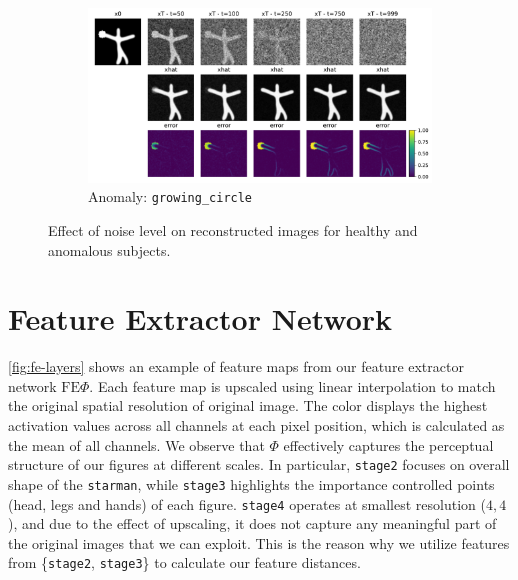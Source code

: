 \begin{figure}[htbp]
    \begin{subfigure}{0.75\linewidth}
        \includegraphics[width=\linewidth]{figures/effect_noise_growing_circle.pdf}
        \caption{Anomaly: \texttt{growing\_circle}}
    \end{subfigure}

    \caption{Effect of noise level on reconstructed images for healthy and anomalous subjects.}
    \label{fig:effect-noise-example}
\end{figure}

\chapter{Feature Extractor Network}
\label{app:fe-layer}

\cref{fig:fe-layers} shows an example of feature maps from our feature extractor network $\text{FE} \Phi$. Each feature map is upscaled using linear interpolation to match the original spatial resolution of original image. The color displays the highest activation values across all channels at each pixel position, which is calculated as the mean of all channels. We observe that $\Phi$ effectively captures the perceptual structure of our figures at different scales. In particular, \texttt{stage2} focuses on overall shape of the \texttt{starman}, while \texttt{stage3} highlights the importance controlled points (head, legs and hands) of each figure. \texttt{stage4} operates at smallest resolution ($4, 4$), and due to the effect of upscaling, it does not capture any meaningful part of the original images that we can exploit. This is the reason why we utilize features from \{\texttt{stage2}, \texttt{stage3}\} to calculate our feature distances. 

